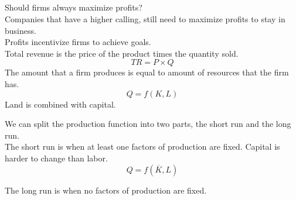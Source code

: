 \subsection{}
Should firms always maximize profits?\\
Companies that have a higher calling, still need to maximize profits to stay in business.\\
Profits incentivize firms to achieve goals.\\
Total revenue is the price of the product times the quantity sold.
\begin{equation}
    TR = P \times Q
\end{equation}
The amount that a firm produces is equal to amount of resources that the firm has.\\
\begin{equation}
    Q = f(K,L)
\end{equation}
Land is combined with capital.
\par
We can split the production function into two parts, the short run and the long run.\\
The short run is when at least one factors of production are fixed.
Capital is harder to change than labor.
\begin{equation}
    Q = f(\overline{K}, L)
\end{equation}
\par
The long run is when no factors of production are fixed.
